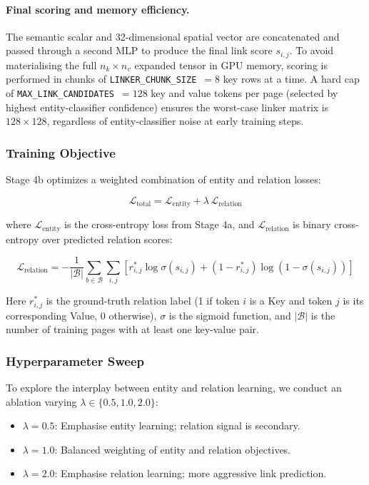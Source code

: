 \paragraph{Final scoring and memory efficiency.}
The semantic scalar and 32-dimensional spatial vector are concatenated and passed through a second MLP to produce the final link score $s_{i,j}$. To avoid materialising the full $n_k \times n_v$ expanded tensor in GPU memory, scoring is performed in chunks of \texttt{LINKER\_CHUNK\_SIZE}~$= 8$ key rows at a time. A hard cap of \texttt{MAX\_LINK\_CANDIDATES}~$= 128$ key and value tokens per page (selected by highest entity-classifier confidence) ensures the worst-case linker matrix is $128 \times 128$, regardless of entity-classifier noise at early training steps.

\subsubsection{Training Objective}

Stage 4b optimizes a weighted combination of entity and relation losses:

\[
\mathcal{L}_{\text{total}} = \mathcal{L}_{\text{entity}} + \lambda \, \mathcal{L}_{\text{relation}}
\]

where $\mathcal{L}_{\text{entity}}$ is the cross-entropy loss from Stage 4a, and $\mathcal{L}_{\text{relation}}$ is binary cross-entropy over predicted relation scores:

\[
\mathcal{L}_{\text{relation}} = -\frac{1}{|\mathcal{B}|} \sum_{b \in \mathcal{B}} \sum_{i,j} \left[ r^*_{i,j} \log \sigma(s_{i,j}) + (1 - r^*_{i,j}) \log(1 - \sigma(s_{i,j})) \right]
\]

Here $r^*_{i,j}$ is the ground-truth relation label (1 if token $i$ is a Key and token $j$ is its corresponding Value, 0 otherwise), $\sigma$ is the sigmoid function, and $|\mathcal{B}|$ is the number of training pages with at least one key-value pair.

\subsubsection{Hyperparameter Sweep}

To explore the interplay between entity and relation learning, we conduct an ablation varying $\lambda \in \{0.5, 1.0, 2.0\}$:

\begin{itemize}
    \item $\lambda = 0.5$: Emphasise entity learning; relation signal is secondary.
    \item $\lambda = 1.0$: Balanced weighting of entity and relation objectives.
    \item $\lambda = 2.0$: Emphasise relation learning; more aggressive link prediction.
\end{itemize}

